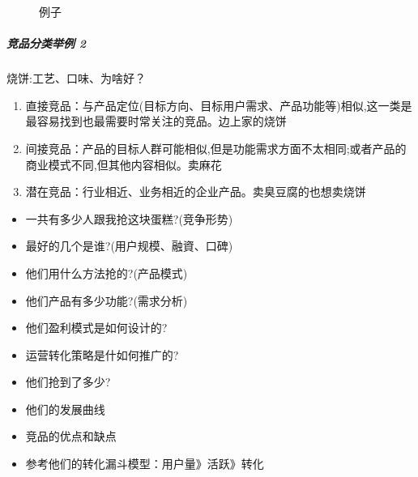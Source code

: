 \documentclass[letterpaper,11pt,english]{sphinxmanual}
\begin{document}
\begin{figure}[H]
\centering
\capstart

\noindent{}
\caption{例子}\label{\detokenize{chapter_knowledge/goods_analysis:id33}}\end{figure}


\subparagraph{竞品分类举例 2\sphinxfootnotemark[455]}
\label{\detokenize{chapter_knowledge/goods_analysis:id16}}%
\begin{footnotetext}[455]\sphinxAtStartFootnote
{}
%
\end{footnotetext}\ignorespaces 
烧饼:工艺、口味、为啥好？
\begin{enumerate}
%
\item {} 
直接竞品：与产品定位(目标方向、目标用户需求、产品功能等)相似,这一类是最容易找到也最需要时常关注的竞品。边上家的烧饼

\item {} 
间接竞品：产品的目标人群可能相似,但是功能需求方面不太相同;或者产品的商业模式不同,但其他内容相似。卖麻花

\item {} 
潜在竞品：行业相近、业务相近的企业产品。卖臭豆腐的也想卖烧饼

\end{enumerate}
\begin{itemize}
\item {} 
一共有多少人跟我抢这块蛋糕?(竞争形势)

\item {} 
最好的几个是谁?(用户规模、融資、口碑)

\item {} 
他们用什么方法抢的?(产品模式)

\item {} 
他们产品有多少功能?(需求分析)

\item {} 
他们盈利模式是如何设计的?

\item {} 
运营转化策略是什如何推广的?

\item {} 
他们抢到了多少?

\item {} 
他们的发展曲线

\item {} 
竞品的优点和缺点

\item {} 
参考他们的转化漏斗模型：用户量\sphinxhyphen{}》活跃\sphinxhyphen{}》转化

\end{itemize}
\end{document}
